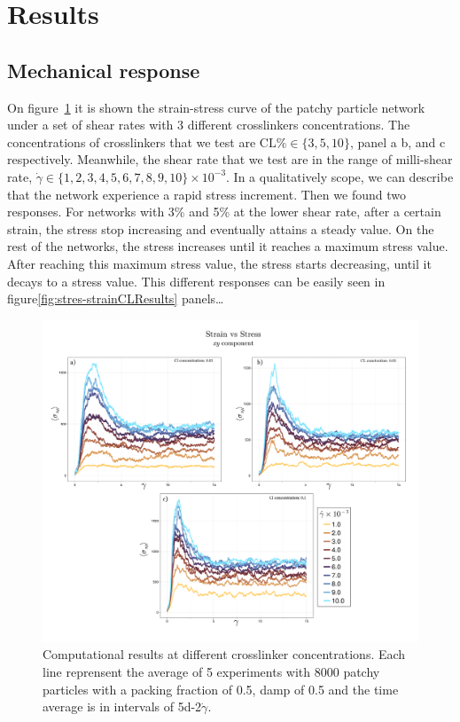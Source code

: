 \section{Results}

\subsection{Mechanical response}

On figure~\ref{fig:stres-strainResults} it is shown the strain-stress curve of the patchy particle network under a set of shear rates with 3 different crosslinkers concentrations.
The concentrations of crosslinkers that we test are $\mathrm{CL}\%\in\{3,5,10\}$, panel a b, and c respectively.
Meanwhile, the shear rate that we test are in the range of milli-shear rate, $\dot{\gamma}\in\{1,2,3,4,5,6,7,8,9,10\}\times10^{-3}$.
In a qualitatively scope, we can describe that the network experience a rapid stress increment.
Then we found two responses.
For networks with 3\% and 5\% at the lower shear rate, after a certain strain, the stress stop increasing and eventually attains a steady value.
On the rest of the networks, the stress increases until it reaches a maximum stress value.
After reaching this maximum stress value, the stress starts decreasing, until it decays to a stress value.
This different responses can be easily seen in figure\ref{fig:stres-strainCLResults} panels\ldots

\begin{figure}[ht!]
    \centering
    \includegraphics[width=\textwidth]{figs/ComputaitonalResults/stress-strain.pdf}
    \caption{Computational results at different crosslinker concentrations. Each line reprensent the average of 5 experiments with \num{8000} patchy particles with a packing fraction of \num{0.5}, damp of \num{0.5} and the time average is in intervals of \num{5d-2}$\dot{\gamma}$.}\label{fig:stres-strainResults}
\end{figure}

